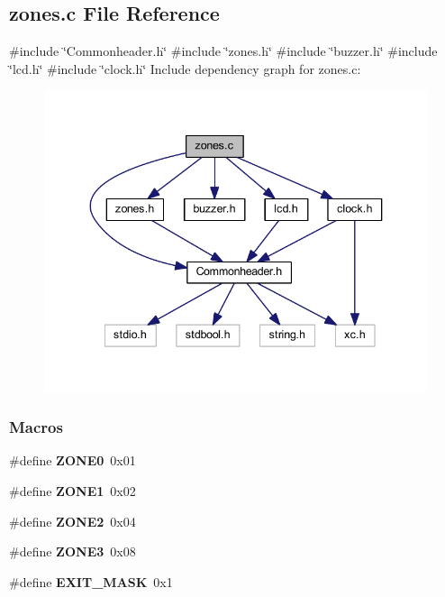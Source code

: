 \subsection{zones.\+c File Reference}
\label{a00059}
{\ttfamily \#include \char`\"{}Commonheader.\+h\char`\"{}}\newline
{\ttfamily \#include \char`\"{}zones.\+h\char`\"{}}\newline
{\ttfamily \#include \char`\"{}buzzer.\+h\char`\"{}}\newline
{\ttfamily \#include \char`\"{}lcd.\+h\char`\"{}}\newline
{\ttfamily \#include \char`\"{}clock.\+h\char`\"{}}\newline
Include dependency graph for zones.\+c\+:
\nopagebreak
\begin{figure}[H]
\begin{center}
\leavevmode
\includegraphics[width=340pt]{a00060}
\end{center}
\end{figure}
\subsubsection*{Macros}
\begin{DoxyCompactItemize}
\item 
\#define \textbf{ Z\+O\+N\+E0}~0x01
\item 
\#define \textbf{ Z\+O\+N\+E1}~0x02
\item 
\#define \textbf{ Z\+O\+N\+E2}~0x04
\item 
\#define \textbf{ Z\+O\+N\+E3}~0x08
\item 
\#define \textbf{ E\+X\+I\+T\+\_\+\+M\+A\+SK}~0x1
\end{DoxyCompactItemize}
